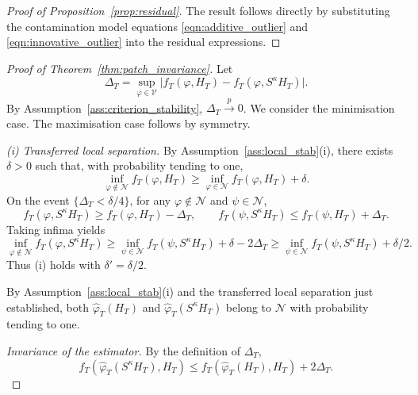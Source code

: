 \documentclass[12pt]{article}
\numberwithin{equation}{section}
\begin{document}
\begin{proof}[Proof of Proposition~\ref{prop:residual}]

The result follows directly by substituting the contamination model equations \eqref{eqn:additive_outlier} and \eqref{eqn:innovative_outlier} into the residual expressions.
\end{proof}



\begin{proof}[Proof of Theorem~\ref{thm:patch_invariance}]
Let
\begin{equation}
\Delta_T =
\sup_{\varphi\in\mathcal V}
\bigl|
f_T(\varphi,H_T)-f_T(\varphi,S^\kappa H_T)
\bigr|.
\end{equation}
By Assumption~\ref{ass:criterion_stability}, $\Delta_T \overset{p}{\longrightarrow}0$.
We consider the minimisation case. The maximisation case follows by symmetry.

\noindent
\textit{(i) Transferred local separation.}
By Assumption~\ref{ass:local_stab}(i), there exists $\delta>0$ such that, with probability tending to one,
\begin{equation}
\inf_{\varphi\notin\mathcal N} f_T(\varphi,H_T)
\ge
\inf_{\varphi\in\mathcal N} f_T(\varphi,H_T)+\delta.
\end{equation}
On the event $\{\Delta_T<\delta/4\}$, for any $\varphi\notin\mathcal N$ and $\psi\in\mathcal N$,
\begin{equation}
f_T(\varphi,S^\kappa H_T)
\ge
f_T(\varphi,H_T)-\Delta_T,
\qquad
f_T(\psi,S^\kappa H_T)
\le
f_T(\psi,H_T)+\Delta_T.
\end{equation}
Taking infima yields
\begin{equation}
\inf_{\varphi\notin\mathcal N} f_T(\varphi,S^\kappa H_T)
\ge
\inf_{\psi\in\mathcal N} f_T(\psi,S^\kappa H_T)+\delta-2\Delta_T
\ge
\inf_{\psi\in\mathcal N} f_T(\psi,S^\kappa H_T)+\delta/2.
\end{equation}
Thus (i) holds with $\delta'=\delta/2$.

By Assumption~\ref{ass:local_stab}(i) and the transferred local separation just established, both $\hat{\varphi}_T(H_T)$ and $\hat{\varphi}_T(S^\kappa H_T)$ belong to $\mathcal N$ with probability tending to one.

\noindent
\textit{Invariance of the estimator.}
By the definition of $\Delta_T$,
\begin{equation}\label{eq:deltat_bound}
f_T(\hat{\varphi}_T(S^\kappa H_T),H_T)
\le
f_T(\hat{\varphi}_T(H_T),H_T) + 2\Delta_T.
\end{equation}


\end{proof}
\end{document}
